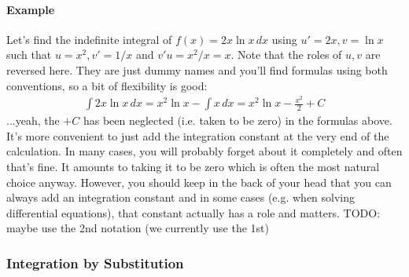 
\paragraph{Example} Let's find the indefinite integral of $f(x) = 2 x \ln x \, dx$ using $u' = 2 x, v = \ln x$ such that $u = x^2, v' = 1/x$ and $v' u = x^2/x = x$. Note that the roles of $u,v$ are reversed here. They are just dummy names and you'll find formulas using both conventions, so a bit of flexibility is good:
\begin{align}
  \int 2 x \ln x \, dx = x^2 \ln x - \int x \, dx = x^2 \ln x - \frac{x^2}{2} + C
\end{align}
...yeah, the $+ C$ has been neglected (i.e. taken to be zero) in the formulas above. It's more convenient to just add the integration constant at the very end of the calculation. In many cases, you will probably forget about it completely and often that's fine. It amounts to taking it to be zero which is often the most natural choice anyway. However, you should keep in the back of your head that you can always add an integration constant and in some cases (e.g. when solving differential equations), that constant actually has a role and matters.
TODO: maybe use the 2nd notation (we currently use the 1st)






\subsubsection{Integration by Substitution} 

